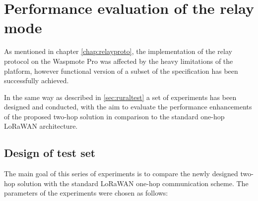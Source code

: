 \chapter{Performance evaluation of the relay mode}

As mentioned in chapter \ref{chap:relayproto}, the implementation of the relay protocol on the Waspmote Pro was affected by the heavy limitations of the platform, however functional version of a subset of the specification has been successfully achieved. 

In the same way as described in \ref{sec:ruraltest} a set of experiments has been designed and conducted, with the aim to evaluate the performance enhancements of the proposed two-hop solution in comparison to the standard one-hop LoRaWAN architecture.


\section{Design of test set}

The main goal of this series of experiments is to compare the newly designed two-hop solution with the standard LoRaWAN one-hop communication scheme. The parameters of the experiments were chosen as follows:


